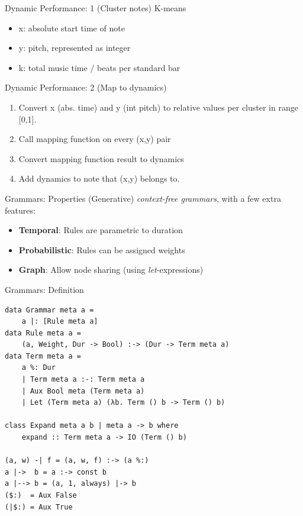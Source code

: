 \documentclass{beamer}
\begin{document}
        \begin{frame}{Dynamic Performance: 1 (Cluster notes)}
                    K-means
                    \begin{itemize}
                    \item x: absolute start time of note
                    \item y: pitch, represented as integer
                    \item k: total music time / beats per standard bar
                    \end{itemize}
        \end{frame}
        
        \begin{frame}{Dynamic Performance: 2 (Map to dynamics)}
                    \begin{enumerate}
                    \item	Convert x (abs. time) and y (int pitch) to relative values per cluster in range [0,1].
                    \item Call mapping function on every (x,y) pair
                    \item Convert mapping function result to dynamics
                    \item Add dynamics to note that (x,y) belongs to.
                    \end{enumerate}
        \end{frame}

	\begin{frame}[fragile=singleslide]{Grammars: Properties}
    (Generative) \textit{context-free grammars}, with a few extra features:
	\begin{itemize}
	\item \textbf{Temporal}: Rules are parametric to duration
	\item \textbf{Probabilistic}: Rules can be assigned weights
	\item \textbf{Graph}: Allow node sharing (using \textit{let}-expressions)
	\end{itemize}
	\end{frame}

	\begin{frame}[fragile=singleslide]{Grammars: Definition}
	\begin{verbatim}
data Grammar meta a =
    a |: [Rule meta a]
data Rule meta a =
    (a, Weight, Dur -> Bool) :-> (Dur -> Term meta a)
data Term meta a =
    a %: Dur
    | Term meta a :-: Term meta a
    | Aux Bool meta (Term meta a)
    | Let (Term meta a) (λb. Term () b -> Term () b)

class Expand meta a b | meta a -> b where
    expand :: Term meta a -> IO (Term () b)

(a, w) -| f = (a, w, f) :-> (a %:)
a |->  b = a :-> const b
a |--> b = (a, 1, always) |-> b
($:)  = Aux False
(|$:) = Aux True
	\end{verbatim}
	\end{frame}
\end{document}
